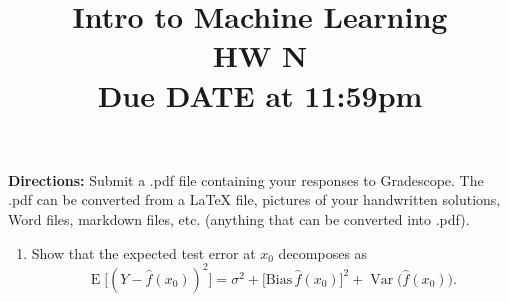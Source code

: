 \documentclass[11pt]{article}
\title{Intro to Machine Learning\\ HW N\\ Due DATE at 11:59pm}
\author{}
\date{}
\newcommand{\E}{\operatorname{E}}
\newcommand{\Var}{\operatorname{Var}}
\newif\ifsolutions
\newcommand{\solution}[1]{\ifsolutions\par\medskip\noindent\textbf{Solution.} #1\par\medskip\fi}
\begin{document}
\maketitle

\textbf{Directions:} Submit a .pdf file containing your responses to Gradescope. The .pdf can be
converted from a LaTeX file, pictures of your handwritten solutions, Word files, markdown files,
etc. (anything that can be converted into .pdf).

\begin{enumerate}
  \item Show that the expected test error at $x_0$ decomposes as
  \[
    \E\big[(Y - \hat f(x_0))^2\big] = \sigma^2 + \big[\mathrm{Bias}\,\hat f(x_0)\big]^2 + \Var\big(\hat f(x_0)\big).
  \]
  \solution{Add and subtract $f(x_0)$ and $\E\hat f(x_0)$; the cross terms vanish.}
\end{enumerate}
\end{document}

